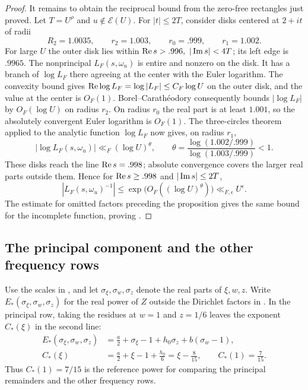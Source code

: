 \begin{proof}
It remains to obtain the reciprocal bound from the zero-free rectangles
just proved.  Let \(T=U^\rho\) and \(u\notin\mathcal E(U)\).  For
\(|t|\le2T\), consider disks centered at \(2+it\) of radii
\[
 R_2=1.0035,\qquad r_2=1.003,\qquad r_0=.999,\qquad r_1=1.002.
\]
For large \(U\) the outer disk lies within
\(\re s>.996,\ |\im s|<4T\); its left edge is \(.9965\).
The nonprincipal \(L_F(s,\omega_u)\) is entire and nonzero on the disk.
It has a branch of \(\log L_F\) there agreeing at the center with the
Euler logarithm.  The convexity bound gives
\(\operatorname{Re}\log L_F=\log|L_F|\le C_F\log U\) on the outer disk, and the value
at the center is \(O_F(1)\).  Borel--Carathéodory consequently bounds
\(|\log L_F|\) by \(O_F(\log U)\) on radius \(r_2\).  On radius \(r_0\)
the real part is at least \(1.001\), so the absolutely convergent Euler
logarithm is \(O_F(1)\).  The three-circles theorem applied to the
analytic function \(\log L_F\) now gives, on radius \(r_1\),
\[
 |\log L_F(s,\omega_u)|\ll_F(\log U)^\theta,\qquad
 \theta=\frac{\log(1.002/.999)}{\log(1.003/.999)}<1.
\]
These disks reach the line \(\operatorname{Re} s=.998\); absolute convergence covers
the larger real parts outside them.  Hence for \(\operatorname{Re} s\ge.998\) and
\(|\operatorname{Im} s|\le2T\),
\[
 |L_F(s,\omega_u)^{-1}|
       \le \exp\bigl(O_F((\log U)^\theta)\bigr)
       \ll_{F,\epsilon}U^\epsilon .
\]
The estimate for omitted factors preceding the proposition gives the
same bound for the incomplete function, proving
.
\end{proof}

\subsection{The principal component and the other frequency rows}

Use the scales in , and let
\(\sigma_\xi,\sigma_w,\sigma_z\) denote the real parts of
\(\xi,w,z\).  Write \(E_*(\sigma_\xi,\sigma_w,\sigma_z)\) for the real
power of \(Z\) outside the Dirichlet factors in .
In the principal row, taking the residues at \(w=1\) and
\(z=1/6\) leaves the exponent \(C_*(\xi)\) in the second line:
\begin{equation}
 \begin{split}
 E_*(\sigma_\xi,\sigma_w,\sigma_z)
       &=\frac a2+\sigma_\xi-1+h_0\sigma_z+b(\sigma_w-1),\\
 C_*(\xi)&=\frac a2+\xi-1+\frac{h_0}{6}
                  =\xi-\frac8{15},\qquad C_*(1)=\frac7{15}.
 \end{split}
\label{eq:contour-exponent}
\end{equation}
Thus \(C_*(1)=7/15\) is the reference power for comparing the
principal remainders and the other frequency rows.

